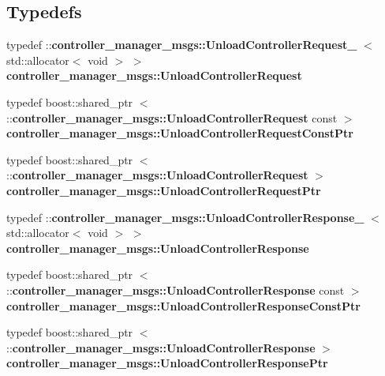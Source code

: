 \subsection*{\-Typedefs}
\begin{DoxyCompactItemize}
\item 
typedef \*
\-::{\bf controller\-\_\-manager\-\_\-msgs\-::\-Unload\-Controller\-Request\-\_\-}\*
$<$ std\-::allocator$<$ void $>$ $>$ {\bf controller\-\_\-manager\-\_\-msgs\-::\-Unload\-Controller\-Request}
\item 
typedef boost\-::shared\-\_\-ptr\*
$<$ \-::{\bf controller\-\_\-manager\-\_\-msgs\-::\-Unload\-Controller\-Request} \*
const  $>$ {\bf controller\-\_\-manager\-\_\-msgs\-::\-Unload\-Controller\-Request\-Const\-Ptr}
\item 
typedef boost\-::shared\-\_\-ptr\*
$<$ \-::{\bf controller\-\_\-manager\-\_\-msgs\-::\-Unload\-Controller\-Request} $>$ {\bf controller\-\_\-manager\-\_\-msgs\-::\-Unload\-Controller\-Request\-Ptr}
\item 
typedef \*
\-::{\bf controller\-\_\-manager\-\_\-msgs\-::\-Unload\-Controller\-Response\-\_\-}\*
$<$ std\-::allocator$<$ void $>$ $>$ {\bf controller\-\_\-manager\-\_\-msgs\-::\-Unload\-Controller\-Response}
\item 
typedef boost\-::shared\-\_\-ptr\*
$<$ \-::{\bf controller\-\_\-manager\-\_\-msgs\-::\-Unload\-Controller\-Response} \*
const  $>$ {\bf controller\-\_\-manager\-\_\-msgs\-::\-Unload\-Controller\-Response\-Const\-Ptr}
\item 
typedef boost\-::shared\-\_\-ptr\*
$<$ \-::{\bf controller\-\_\-manager\-\_\-msgs\-::\-Unload\-Controller\-Response} $>$ {\bf controller\-\_\-manager\-\_\-msgs\-::\-Unload\-Controller\-Response\-Ptr}
\end{DoxyCompactItemize}
